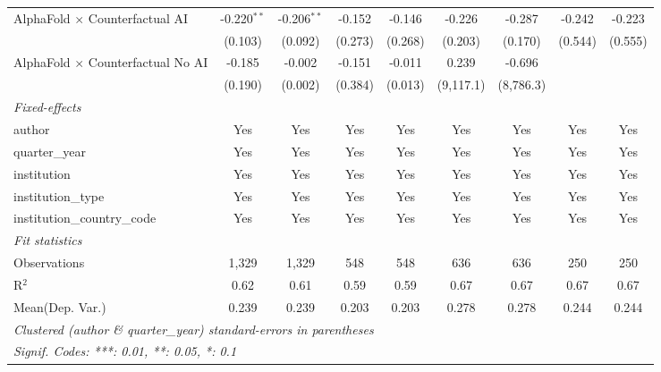 \begin{tabular}{lcccccccc}
   AlphaFold $\times$ Counterfactual AI     & -0.220$^{**}$ & -0.206$^{**}$ & -0.152  & -0.146  & -0.226      & -0.287    & -0.242  & -0.223\\   
                                            & (0.103)       & (0.092)       & (0.273) & (0.268) & (0.203)     & (0.170)   & (0.544) & (0.555)\\   
   AlphaFold $\times$ Counterfactual No AI  & -0.185        & -0.002        & -0.151  & -0.011  & 0.239       & -0.696    &         &   \\   
                                            & (0.190)       & (0.002)       & (0.384) & (0.013) & (9,117.1)   & (8,786.3) &         &   \\   
   \midrule
   \emph{Fixed-effects}\\
   author                                   & Yes           & Yes           & Yes     & Yes     & Yes         & Yes       & Yes     & Yes\\  
   quarter\_year                            & Yes           & Yes           & Yes     & Yes     & Yes         & Yes       & Yes     & Yes\\  
   institution                              & Yes           & Yes           & Yes     & Yes     & Yes         & Yes       & Yes     & Yes\\  
   institution\_type                        & Yes           & Yes           & Yes     & Yes     & Yes         & Yes       & Yes     & Yes\\  
   institution\_country\_code               & Yes           & Yes           & Yes     & Yes     & Yes         & Yes       & Yes     & Yes\\  
   \midrule
   \emph{Fit statistics}\\
   Observations                             & 1,329         & 1,329         & 548     & 548     & 636         & 636       & 250     & 250\\  
   R$^2$                                    & 0.62          & 0.61          & 0.59    & 0.59    & 0.67        & 0.67      & 0.67    & 0.67\\  
Mean(Dep. Var.) & 0.239 & 0.239 & 0.203 & 0.203 & 0.278 & 0.278 & 0.244 & 0.244 \\
   \midrule \midrule
   \multicolumn{9}{l}{\emph{Clustered (author \& quarter\_year) standard-errors in parentheses}}\\
   \multicolumn{9}{l}{\emph{Signif. Codes: ***: 0.01, **: 0.05, *: 0.1}}\\
\end{tabular}
\par\endgroup

